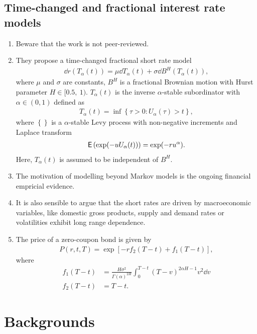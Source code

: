 \documentclass[square]{article} %
\theoremstyle{plain}
\theoremstyle{definition} %
\begin{document}
\subsection{Time-changed and fractional interest rate models}

\cite{shokrollahi2021time}
\begin{enumerate}
  \item Beware that the work is not peer-reviewed. 
  \item They propose a time-changed fractional short rate model 
  \begin{align*}
    \dd r(T_\alpha(t)) = \mu \dd T_\alpha(t) + \sigma \dd B^H(T_\alpha (t)),
  \end{align*}
  where $\mu$ and $\sigma$ are constants, $B^H$ is a fractional Brownian motion with Hurst parameter $H\in[0.5,\ 1)$. 
  $T_\alpha(t)$ is the inverse 
  $\alpha$-stable subordinator with $\alpha \in(0,1)$ defined as 
  \begin{align*}
    T_\alpha(t) = \inf\left\{\tau > 0 : U_\alpha(\tau)>t\right\},
  \end{align*}
  where $\left\{\right\}$ is a $\alpha$-stable Levy process with non-negative increments and Laplace transform
  \begin{align*}
    \mathbb{\sf E}\left(\exp(-u U_\alpha(t))\right)= \exp(-ru^\alpha).
  \end{align*}
  Here, $T_\alpha(t)$ is assumed to be independent of $B^H$. 
  \item The motivation of modelling beyond Markov models is the ongoing financial empricial evidence. 
  \item It is also sensible to argue that the short rates are driven by macroeconomic variables, like 
  domestic gross products, supply and demand rates or volatilities exhibit long range dependence. 
  \item The price of a zero-coupon bond is given by 
  \begin{align*}
    P(r,t,T) = \exp\left[-r f_2(T-t) + f_1(T-t)\right],
  \end{align*}
  where 
  \begin{align*}
f_1(T-t) &= \frac{H \sigma^2}{\Gamma(\alpha)^{2H}}\int^{T-t}_0 (T-v)^{2\alpha H -1}v^2 \dd v\\
f_2(T-t) & = T-t. 
\end{align*}
\end{enumerate}

\section{Backgrounds}
\end{document}
